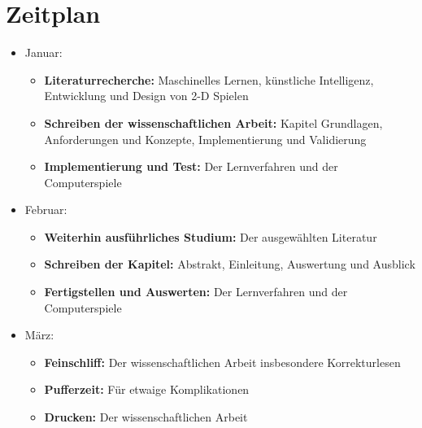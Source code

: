 \documentclass[12pt,a4paper]{scrartcl}
\begin{document}
\section*{Zeitplan}
\begin{itemize}
	\item Januar:
	\begin{itemize}
		\item \textbf{Literaturrecherche:} Maschinelles Lernen, künstliche Intelligenz, Entwicklung und Design von 2-D Spielen
		\item \textbf{Schreiben der wissenschaftlichen Arbeit:} Kapitel Grundlagen, Anforderungen und Konzepte, Implementierung und Validierung
		\item \textbf{Implementierung und Test:} Der Lernverfahren und der Computerspiele
	\end{itemize}
	\item Februar:
	\begin{itemize}
		\item \textbf{Weiterhin ausführliches Studium:} Der ausgewählten Literatur
		\item \textbf{Schreiben der Kapitel:} Abstrakt, Einleitung, Auswertung und Ausblick
		\item \textbf{Fertigstellen und Auswerten:} Der Lernverfahren und der Computerspiele
	\end{itemize}
	\item März:
	\begin{itemize}
		\item \textbf{Feinschliff:} Der wissenschaftlichen Arbeit insbesondere Korrekturlesen
		\item \textbf{Pufferzeit:} Für etwaige Komplikationen
		\item \textbf{Drucken:} Der wissenschaftlichen Arbeit
	\end{itemize}
\end{itemize}
\end{document}
